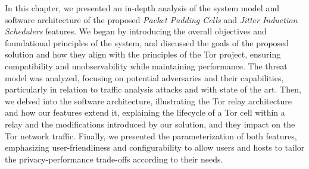 In this chapter, we presented an in-depth analysis of the system model and software architecture of the proposed \textit{Packet Padding Cells} and \textit{Jitter Induction Schedulers} features. We began by introducing the overall objectives and foundational principles of the system, and discussed the goals of the proposed solution and how they align with the principles of the Tor project, ensuring compatibility and unobservability while maintaining performance. The threat model was analyzed, focusing on potential adversaries and their capabilities, particularly in relation to traffic analysis attacks and with state of the art. Then, we delved into the software architecture, illustrating the Tor relay architecture and how our features extend it, explaining the lifecycle of a Tor cell within a relay and the modifications introduced by our solution, and they impact on the Tor network traffic. Finally, we presented the parameterization of both features, emphasizing user-friendliness and configurability to allow users and hosts to tailor the privacy-performance trade-offs according to their needs.

